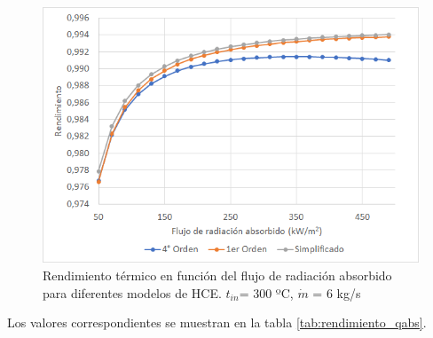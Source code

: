 \begin{figure}[H]
\includegraphics[width=0.9\linewidth]{images/rendimiento_qabs.png}
\caption[Rendimiento térmico en función del flujo de radiación absorbido para diferentes modelos de HCE]{Rendimiento térmico en función del flujo de radiación absorbido para diferentes modelos de HCE. $t_{in}$= 300 ºC, $\dot m$ = 6 kg/s} 
\label{fig:rendimiento_qabs}
\end{figure}

Los valores correspondientes se muestran en la tabla \ref{tab:rendimiento_qabs}.

